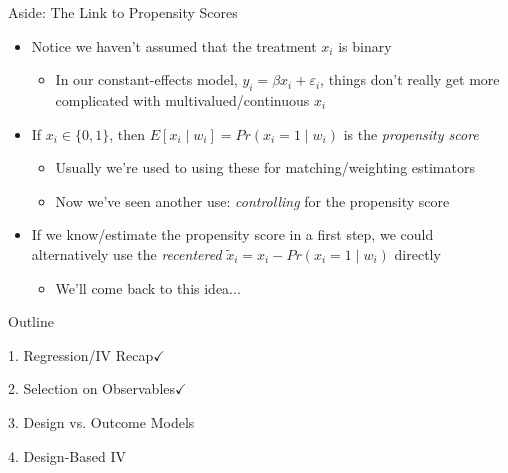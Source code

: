 \documentclass[11pt,english]{beamer}
\begin{document}
\begin{frame}{Aside: The Link to Propensity Scores}
\begin{itemize}
\item Notice we haven't assumed that the treatment $x_i$ is binary\smallskip
\begin{itemize}
\item In our constant-effects model, $y_i=\beta x_i+\varepsilon_i$, things don't really get more complicated with multivalued/continuous $x_i$
\end{itemize}\bigskip\pause{}
\item If $x_i\in\{0,1\}$, then $E[x_i\mid w_i]=Pr(x_i=1\mid w_i)$ is the \emph{propensity score}\smallskip
\begin{itemize}
\item Usually we're used to using these for matching/weighting estimators\smallskip
\item Now we've seen another use: \emph{controlling} for the propensity score 
\end{itemize}\bigskip\pause{}
\item If we know/estimate the propensity score in a first step, we could alternatively use the \emph{recentered} $\tilde{x}_i=x_i-Pr(x_i=1\mid w_i)$ directly\smallskip
\begin{itemize}
\item We'll come back to this idea...
\end{itemize}
\end{itemize}
\end{frame}


\begin{frame}{Outline}

\textcolor{red!75!green!50!blue!25!gray}{1. Regression/IV Recap}$\checkmark$
\vspace{0.8cm}

\textcolor{red!75!green!50!blue!25!gray}{2. Selection on Observables}$\checkmark$
\vspace{0.8cm}

3. Design vs. Outcome Models
\vspace{0.8cm}

\textcolor{red!75!green!50!blue!25!gray}{4. Design-Based IV}

\end{frame}
\end{document}
